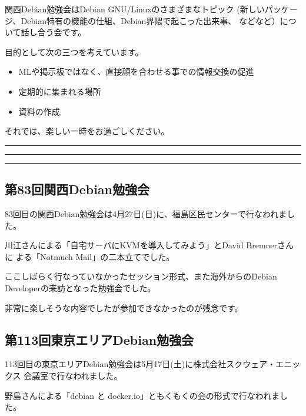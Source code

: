 \documentclass[mingoth,a4paper]{jsarticle}
\begin{document}
 関西Debian勉強会はDebian GNU/Linuxのさまざまなトピック
 (新しいパッケージ、Debian特有の機能の仕組、Debian界隈で起こった出来事、
 などなど）について話し合う会です。

 目的として次の三つを考えています。
 \begin{itemize}
  \item MLや掲示板ではなく、直接顔を合わせる事での情報交換の促進
  \item 定期的に集まれる場所
  \item 資料の作成
 \end{itemize}

 それでは、楽しい一時をお過ごしください。

\newpage

\begin{minipage}[b]{0.2\hsize}
 {}
\end{minipage}
\begin{minipage}[b]{0.8\hsize}
\hrule
\vspace{2mm}
\hrule
\setcounter{tocdepth}{1}
\tableofcontents
\vspace{2mm}
\hrule
\end{minipage}


\subsection{第83回関西Debian勉強会}

83回目の関西Debian勉強会は4月27日(日)に、福島区民センターで行なわれまし
た。

川江さんによる「自宅サーバにKVMを導入してみよう」とDavid Bremnerさんに
よる「Notmuch Mail」の二本立てでした。

ここしばらく行なっていなかったセッション形式、また海外からのDebian
Developerの来訪となった勉強会でした。

非常に楽しそうな内容でしたが参加できなかったのが残念です。

\subsection{第113回東京エリアDebian勉強会}

113回目の東京エリアDebian勉強会は5月17日(土)に株式会社スクウェア・エニッ
クス 会議室で行なわれました。

野島さんによる「debian と docker.io」ともくもくの会の形式で行なわれまし
た。
\end{document}
